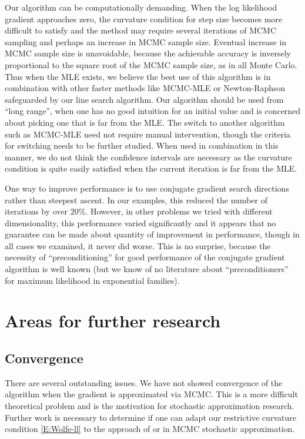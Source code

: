 Our algorithm can be computationally demanding.  
When the log likelihood gradient approaches zero, the 
curvature condition for step size becomes more difficult to satisfy and the method may 
require several iterations of 
MCMC sampling and perhaps an increase in MCMC sample size.  Eventual increase in MCMC 
sample size is unavoidable,
because the achievable accuracy is inversely proportional to the square root of the 
MCMC sample size, as in all Monte Carlo.
Thus when the MLE exists, we believe the best use of this algorithm 
is in combination with other faster 
methods like MCMC-MLE \citep{Geyer:1992}
or Newton-Raphson safeguarded by our line search algorithm.  Our 
algorithm should be used from ``long range'', when one has no good intuition for an 
initial value and is concerned about 
picking one that is far from the MLE.  The switch 
 to another algorithm such as MCMC-MLE 
need not require manual intervention, though the criteria for 
switching needs to be further studied.  When used in combination in this
manner, we do not think the confidence intervals are necessary as the curvature 
condition is quite easily satisfied 
when the current iteration is far from the MLE.

One way to improve performance is to use conjugate gradient search directions rather 
than steepest ascent.  In our 
examples, this reduced the number of iterations by over 20\%.  However, in other 
problems we tried with different 
dimensionality, this performance varied significantly and it appears that no guarantee 
can be made about quantity of 
improvement in performance, though in all cases we examined, it never did worse.  This 
is no surprise, because the
necessity of ``preconditioning'' for good performance of the conjugate gradient 
algorithm is well known (but 
we know of no literature about ``preconditioners'' for 
maximum likelihood in exponential families).

\section{Areas for further research}
\subsection{Convergence}
There are several outstanding issues.  We have not showed convergence of 
the algorithm when the gradient 
is approximated via MCMC.  This is a more difficult theoretical problem and is the 
motivation for stochastic 
approximation research.  
Further work is necessary to determine if one can adapt our restrictive curvature 
condition \eqref{E:Wolfe-ll} to the 
approach of \citet{Andrieu:2005} or \citet{Liang:2010} in MCMC stochastic 
approximation.  

